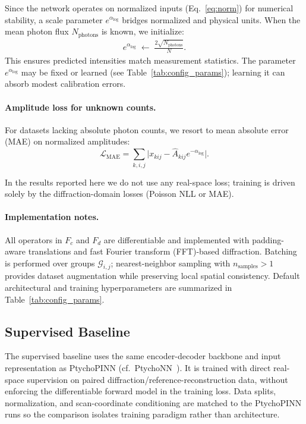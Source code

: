 \documentclass{optica-article}
\begin{document}
Since the network operates on normalized inputs (Eq.~\ref{eq:norm}) for numerical stability, a scale parameter $e^{\alpha_{\log}}$ bridges normalized and physical units. When the mean photon flux $N_{\text{photons}}$ is known, we initialize:
\begin{align}
  e^{\alpha_{\log}} \;\leftarrow\; \frac{2\sqrt{N_{\text{photons}}}}{N}.
  \label{eq:alphaloginit}
\end{align}
This ensures predicted intensities match measurement statistics. The parameter $e^{\alpha_{\log}}$ may be fixed or learned (see Table~\ref{tab:config_params}); learning it can absorb modest calibration errors.

\paragraph{Amplitude loss for unknown counts.}
For datasets lacking absolute photon counts, we resort to mean absolute error (MAE) on normalized amplitudes:
\[
\mathcal{L}_{\text{MAE}}=\sum_{k,i,j} \big|x_{kij} - \hat{A}_{kij}e^{-\alpha_{\log}}\big|.
\]

In the results reported here we do not use any real-space loss; training is driven solely by the diffraction-domain losses (Poisson NLL or MAE).

\paragraph{Implementation notes.}
All operators in $F_c$ and $F_d$ are differentiable and implemented with padding-aware translations and fast Fourier transform (FFT)-based diffraction. Batching is performed over groups $\mathcal{G}_{i,j}$; nearest-neighbor sampling with $n_{\text{samples}}>1$ provides dataset augmentation while preserving local spatial consistency. Default architectural and training hyperparameters are summarized in Table~\ref{tab:config_params}.

\subsection{Supervised Baseline}
The supervised baseline uses the same encoder-decoder backbone and input representation as PtychoPINN (cf.~PtychoNN~\cite{Cherukara2020PtychoNN}). It is trained with direct real-space supervision on paired diffraction/reference-reconstruction data, without enforcing the differentiable forward model in the training loss. Data splits, normalization, and scan-coordinate conditioning are matched to the PtychoPINN runs so the comparison isolates training paradigm rather than architecture.
\end{document}
